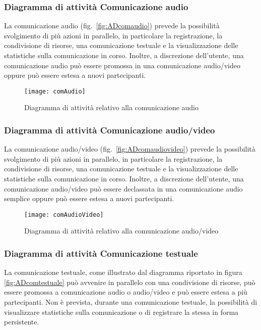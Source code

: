 \subsubsection{Diagramma di attività Comunicazione audio}
La comunicazione audio (fig.~\vref{fig:ADcomaudio}) prevede la possibilità svolgimento di più azioni in parallelo, in particolare la registrazione, la condivisione di risorse, una comunicazione testuale e la visualizzazione delle statistiche sulla comunicazione in corso. Inoltre, a discrezione dell'utente, una comunicazione audio può essere promossa in una comunicazione audio/video oppure può essere estesa a nuovi partecipanti.

\begin{figure}[H]
  \centering
  \texttt{[image: comAudio]}
  \caption{Diagramma di attività relativo alla comunicazione audio}\label{fig:ADcomaudio}
\end{figure}

\subsubsection{Diagramma di attività Comunicazione audio/video}
La comunicazione audio/video (fig.~\vref{fig:ADcomaudiovideo}) prevede la possibilità svolgimento di più azioni in parallelo, in particolare la registrazione, la condivisione di risorse, una comunicazione testuale e la visualizzazione delle statistiche sulla comunicazione in corso. Inoltre, a discrezione dell'utente, una comunicazione audio/video può essere declassata in una comunicazione audio semplice oppure può essere estesa a nuovi partecipanti.

\begin{figure}[H]
  \centering
  \texttt{[image: comAudioVideo]}
  \caption{Diagramma di attività relativo alla comunicazione audio/video}\label{fig:ADcomaudiovideo}
\end{figure}

\subsubsection{Diagramma di attività Comunicazione testuale}
La comunicazione testuale, come illustrato dal diagramma riportato in figura \vref{fig:ADcomtestuale} può avvenire in parallelo con una condivisione di risorse, può essere promossa a comunicazione audio o audio/video e può essere estesa a più partecipanti. Non è prevista, durante una comunicazione testuale, la possibilità di visualizzare statistiche sulla comunicazione o di registrare la stessa in forma persistente.

